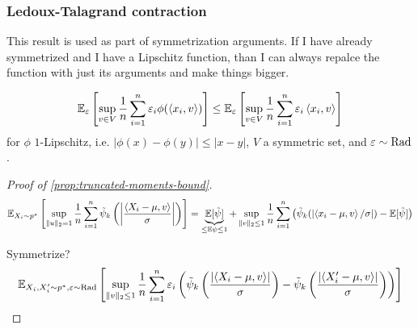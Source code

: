 \subsubsection{Ledoux-Talagrand contraction}%
\label{ssec:ledoux-talagrand-first}

This result is used as part of symmetrization arguments. If I have already symmetrized and I have
a Lipschitz function, than I can always repalce the function with just its
arguments and make things bigger.

\begin{theorem}
  \begin{align}
    \mathbb{E}_{\varepsilon}\left[
      \sup_{v \in V} \frac{1}{n} \sum^{n}_{i=1} \varepsilon_i \phi(\braket{x_i, v})
    \right]
    \leq \mathbb{E}_\varepsilon\left[
      \sup_{v \in V} \frac{1}{n} \sum_{i=1}^n \varepsilon_i \braket{x_i, v}
    \right]
  \end{align}
  for $\phi$ $1$-Lipschitz, i.e. $\vert \phi(x) - \phi(y) \rvert \leq \lvert x - y \rvert$,
  $V$ a symmetric set, and $\varepsilon \sim \text{Rad}$.
\end{theorem}

\begin{proof}[Proof of \cref{prop:truncated-moments-bound}]
  \begin{align}
    \mathbb{E}_{X_i \sim p^*}\left[
      \sup_{\|u\|_2 = 1} \frac{1}{n} \sum_{i=1}^n \tilde{\psi}_k\left(
        \left\lvert \frac{\braket{X_i - \mu, v}}{\sigma}\right\rvert
      \right)
    \right]
    = \underbrace{\mathbb{E}[\tilde{\psi}]}_{\leq \mathbb{E}\psi \leq 1} + \sup_{\|v\|_2 \leq 1} \frac{1}{n} \sum^{n}_{i=1} \left(
      \tilde{\psi}_k(\lvert \braket{x_i - \mu, v} / \sigma \rvert) - \mathbb{E}[\tilde\psi]
    \right)
  \end{align}

  Symmetrize?
  \begin{align}
    \mathbb{E}_{X_i, X_i' \sim p^*, \varepsilon \sim \text{Rad}}\left[
      \sup_{\|v\|_2 \leq 1} \frac{1}{n} \sum^{n}_{i=1}
      \varepsilon_i \left(
        \tilde{\psi}_k\left(\frac{\lvert \braket{X_i - \mu, v}\rvert}{\sigma}\right)
        -  \tilde{\psi}_k\left(\frac{\lvert \braket{X_i' - \mu, v}\rvert}{\sigma}\right)
      \right)
    \right]
  \end{align}
\end{proof}
